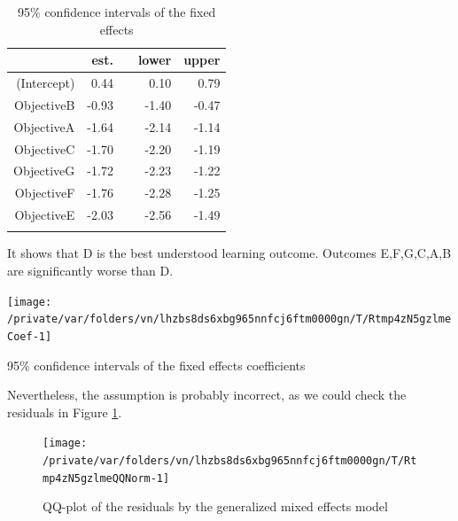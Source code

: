 \documentclass[12pt,english,nohyper]{tufte-handout}\usepackage[]{graphicx}\usepackage[]{color}
\newenvironment{knitrout}{}{} %
\begin{document}
\begin{longtable}{rrlrr}
  \hline
 & est. &    & lower & upper \\ 
  \hline
(Intercept) & 0.44 &  & 0.10 & 0.79 \\ 
  ObjectiveB & -0.93 &  & -1.40 & -0.47 \\ 
  ObjectiveA & -1.64 &  & -2.14 & -1.14 \\ 
  ObjectiveC & -1.70 &  & -2.20 & -1.19 \\ 
  ObjectiveG & -1.72 &  & -2.23 & -1.22 \\ 
  ObjectiveF & -1.76 &  & -2.28 & -1.25 \\ 
  ObjectiveE & -2.03 &  & -2.56 & -1.49 \\ 
   \hline
\hline
\caption{95\% confidence intervals of the fixed effects} 
\label{tab:lme_fixed}
\end{longtable}


It shows that D is the best understood learning outcome.
Outcomes E,F,G,C,A,B are
significantly worse than D.



\begin{knitrout}
\color{fgcolor}\begin{marginfigure}
\texttt{[image: /private/var/folders/vn/lhzbs8ds6xbg965nnfcj6ftm0000gn/T/Rtmp4zN5gzlmeCoef-1]} \caption[95\% confidence intervals of the fixed effects coefficients]{95\% confidence intervals of the fixed effects coefficients}\label{mar:lmeCoef}
\end{marginfigure}


\end{knitrout}

Nevertheless, the assumption is probably incorrect, as we could check the residuals in
Figure \ref{fig:lmeQQNorm}.

\begin{knitrout}
\color{fgcolor}\begin{figure}

{\centering \texttt{[image: /private/var/folders/vn/lhzbs8ds6xbg965nnfcj6ftm0000gn/T/Rtmp4zN5gzlmeQQNorm-1]} 

}

\caption[QQ-plot of the residuals by the generalized mixed effects model]{QQ-plot of the residuals by the generalized mixed effects model}\label{fig:lmeQQNorm}
\end{figure}


\end{knitrout}
\end{document}
